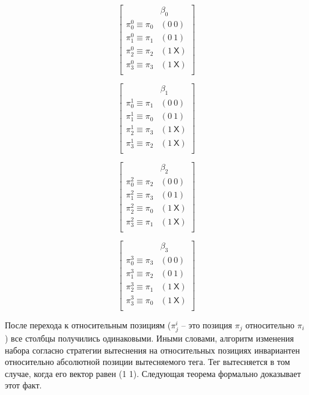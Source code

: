 \parbox{0.24\textwidth}{
$$ \left[
  \begin{array}{c|c}
          & \beta_0 \\ \hline
    \pi^0_0 \equiv \pi_0 & (0~0) \\
    \pi^0_1 \equiv \pi_1 & (0~1) \\
    \pi^0_2 \equiv \pi_2 & (1~\textsf{X}) \\
    \pi^0_3 \equiv \pi_3 & (1~\textsf{X}) \\
  \end{array}
\right]
$$
}\parbox{0.24\textwidth}{
$$ \left[
  \begin{array}{c|c}
          & \beta_1 \\ \hline
    \pi^1_0 \equiv \pi_1 & (0~0) \\
    \pi^1_1 \equiv \pi_0 & (0~1) \\
    \pi^1_2 \equiv \pi_3 & (1~\textsf{X}) \\
    \pi^1_3 \equiv \pi_2 & (1~\textsf{X}) \\
  \end{array}
\right]
$$
}\parbox{0.24\textwidth}{
$$ \left[
  \begin{array}{c|c}
          & \beta_2 \\ \hline
    \pi^2_0 \equiv \pi_2 & (0~0) \\
    \pi^2_1 \equiv \pi_3 & (0~1) \\
    \pi^2_2 \equiv \pi_0 & (1~\textsf{X}) \\
    \pi^2_3 \equiv \pi_1 & (1~\textsf{X}) \\
  \end{array}
\right]
$$
}\parbox{0.24\textwidth}{
$$ \left[
  \begin{array}{c|c}
          & \beta_3 \\ \hline
    \pi^3_0 \equiv \pi_3 & (0~0) \\
    \pi^3_1 \equiv \pi_2 & (0~1) \\
    \pi^3_2 \equiv \pi_1 & (1~\textsf{X}) \\
    \pi^3_3 \equiv \pi_0 & (1~\textsf{X}) \\
  \end{array}
\right]
$$
}

После перехода к относительным позициям ($\pi^i_j$ -- это позиция
$\pi_j$ относительно $\pi_i$) все столбцы получились одинаковыми.
Иными словами, алгоритм изменения набора согласно стратегии
вытеснения \PseudoLRU на относительных позициях инвариантен
относительно абсолютной позиции вытесняемого тега. Тег вытесняется в
том случае, когда его вектор равен (1 1). Следующая теорема
формально доказывает этот факт.

